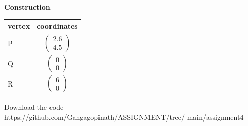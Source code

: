 \documentclass[10pt,a4paper]{article}
\begin{document}
\begin{multicols}{2}
{\begin{center}
\begin{tabular}{|l|c|}
    \hline
      \end{tabular}
  \end{center} \vspace{2mm} 



  \vspace{2mm} \textbf{Construction}
\begin{center}
\setlength{\arrayrulewidth}{0.5mm}
\setlength{\tabcolsep}{6pt}
\renewcommand{\arraystretch}{1.5}
    \begin{tabular}{|l|c|}
  \hline 
  \textbf{vertex} & \textbf{coordinates} \\ \hline
P & $ \begin{pmatrix} 
2.6 \\
4.5
\end{pmatrix} $ \\ \hline
   Q & $\begin{pmatrix}
0 \\
0
\end{pmatrix}$   \\\hline
   R & $\begin{pmatrix}
6 \\
0
\end{pmatrix} $\\
   \hline
    \end{tabular}
\end{center}
  
  
 
\raggedright  Download the code \\
https://github.com/Gangagopinath/ASSIGNMENT/tree/
\newline
main/assignment4
}  \end{multicols}
\end{document}

